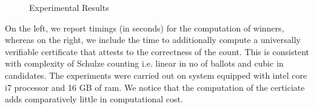 \begin{figure}
\centering     %
{}
\caption{Experimental Results}
\label{fig:test}
\end{figure}



\noindent
On the left, we report timings (in seconds) for the computation of
winners, whereas on the right, we include the time to additionally
compute a universally verifiable certificate that attests  to the
correctness of the count. This is consistent with complexity of Schulze 
counting i.e. linear in no of ballots and cubic in candidates. 
The experiments were carried out on system 
equipped with intel core i7 processor and 16 GB of ram. We notice that the
computation of the certiciate adds comparatively little in
computational cost. 

